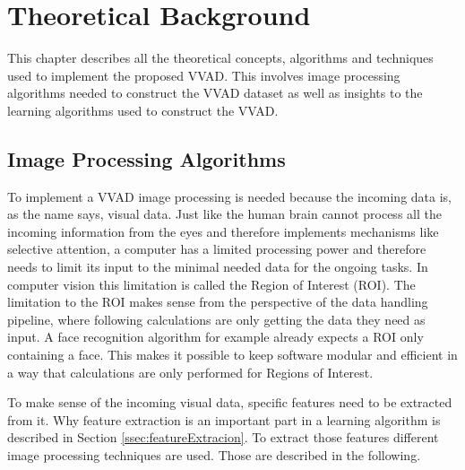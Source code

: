 \chapter{Theoretical Background}\label{theory}
This chapter describes all the theoretical concepts, algorithms and techniques used to implement the proposed VVAD. 
This involves image processing algorithms needed to construct the VVAD dataset as well as insights to the learning algorithms used to construct the VVAD.


\section{Image Processing Algorithms}\label{sec:imageProcessing}
To implement a VVAD image processing is needed because the incoming data is, as the name says, visual data.
Just like the human brain cannot process all the incoming information from the eyes and therefore implements mechanisms like selective attention\cite{RoseSele1992}, 
a computer has a limited processing power and therefore needs to limit its input to the minimal needed data for the ongoing tasks. In computer vision this limitation is called the Region of Interest (ROI). The limitation to the ROI makes sense from the perspective of the data handling pipeline, where following calculations are only getting the data they need as input. A face recognition algorithm for example already 
expects a ROI only containing a face. This makes it possible to keep software modular and efficient in a way that calculations are only performed for Regions of Interest.

To make sense of the incoming visual data, specific features need to be extracted from it. Why feature extraction is an important part in a learning algorithm is described in Section \ref{ssec:featureExtracion}.
To extract those features different image processing techniques are used. Those are described in the following.

